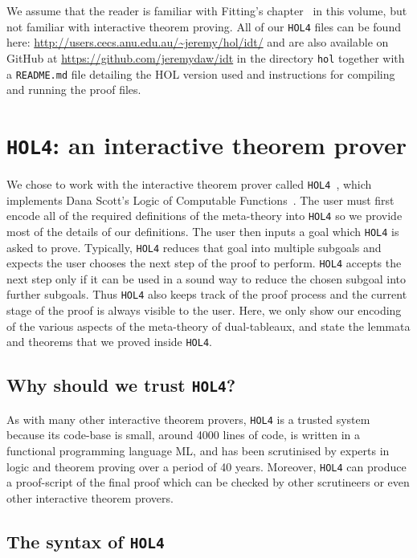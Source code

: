 \documentclass[a4paper]{article}
\newcommand{\hol}{\texttt{HOL4}}
\begin{document}
We assume that the reader is familiar with Fitting's
chapter~\cite{fitting-dual-tableau} in this volume, but not familiar
with interactive theorem proving. All of our \hol{} files can be found
here: %
\url{http://users.cecs.anu.edu.au/~jeremy/hol/idt/}
and are also available on GitHub at 
\url{https://github.com/jeremydaw/idt} in the directory \texttt{hol}
together with a \texttt{README.md} file detailing the HOL version used
and instructions for compiling and running the proof files.

\section{\hol: an interactive theorem prover}

We chose to work with the interactive theorem prover called
\hol~\cite{DBLP:conf/tphol/Gordon08}, which implements Dana Scott's
Logic of Computable Functions~\cite{scott-computable}. The user must
first encode all of the required definitions of the meta-theory into
\hol{} so we provide most of the details of our definitions. The user
then inputs a goal which \hol{} is asked to prove. Typically, \hol{}
reduces that goal into multiple subgoals and expects the user chooses
the next step of the proof to perform. \hol{} accepts the next step
only if it can be used in a sound way to reduce the chosen subgoal
into further subgoals. Thus \hol{} also keeps track of the proof
process and the current stage of the proof is always visible to the
user. Here, we only show our encoding of the various aspects of the
meta-theory of dual-tableaux, and state the lemmata and theorems that
we proved inside \hol.

\subsection{Why should we trust \hol?}

As with many other interactive theorem provers, \hol{} is a trusted
system because its code-base is small, around 4000 lines of
code, is written in a functional programming language ML, and has
been scrutinised by experts in logic and theorem proving over a period
of 40 years. Moreover, \hol{} can produce a proof-script of the final
proof which can be checked by other scrutineers or even other
interactive theorem provers.

\subsection{The syntax of \hol}
\end{document}
